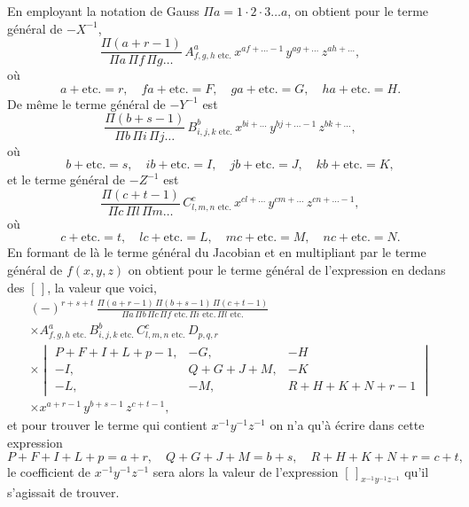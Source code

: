 \documentclass[11pt,a4paper]{book}
\begin{document}
En employant la notation de Gauss $\Pi a=1\cdot 2\cdot 3\ldots a$, on obtient pour le terme g\'{e}n\'{e}ral de $-X^{-1}$,
\[
\frac{\Pi(a+r-1)}{\Pi a\,\Pi f\,\Pi g\ldots}\,A^a_{f,g,h\text{ etc.}}\,x^{af+\ldots-1}\,y^{ag+\ldots}\,z^{ah+\ldots},
\]
o\`{u}
\[
a+\text{etc.}=r,\quad fa+\text{etc.}=F,\quad ga+\text{etc.}=G,\quad ha+\text{etc.}=H.
\]
De m\^{e}me le terme g\'{e}n\'{e}ral de $-Y^{-1}$ est
\[
\frac{\Pi(b+s-1)}{\Pi b\,\Pi i\,\Pi j\ldots}\,B^b_{i,j,k\text{ etc.}}\,x^{bi+\ldots}\,y^{bj+\ldots-1}\,z^{bk+\ldots},
\]
o\`{u}
\[
b+\text{etc.}=s,\quad ib+\text{etc.}=I,\quad jb+\text{etc.}=J,\quad kb+\text{etc.}=K,
\]
et le terme g\'{e}n\'{e}ral de $-Z^{-1}$ est
\[
\frac{\Pi(c+t-1)}{\Pi c\,\Pi l\,\Pi m\ldots}\,C^c_{l,m,n\text{ etc.}}\,x^{cl+\ldots}\,y^{cm+\ldots}\,z^{cn+\ldots-1},
\]
o\`{u}
\[
c+\text{etc.}=t,\quad lc+\text{etc.}=L,\quad mc+\text{etc.}=M,\quad nc+\text{etc.}=N.
\]
En formant de là le terme g\'{e}n\'{e}ral du Jacobian et en multipliant par le terme g\'{e}n\'{e}ral de $f(x,y,z)$ on obtient pour le terme g\'{e}n\'{e}ral de l'expression en dedans des $[\,]$, la valeur que voici,
\begin{multline*}
(-)^{r+s+t}\,\frac{\Pi(a+r-1)\,\Pi(b+s-1)\,\Pi(c+t-1)}{\Pi a\,\Pi b\,\Pi c\,\Pi f\text{ etc.}\,\Pi i\text{ etc.}\,\Pi l\text{ etc.}}\\
\times A^a_{f,g,h\text{ etc.}}\,B^b_{i,j,k\text{ etc.}}\,C^c_{l,m,n\text{ etc.}}\,D_{p,q,r}\\
\times\begin{vmatrix}
P+F+I+L+p-1, & -G, & -H\\
-I, & Q+G+J+M, & -K\\
-L, & -M, & R+H+K+N+r-1
\end{vmatrix}\\
\times x^{a+r-1}\,y^{b+s-1}\,z^{c+t-1},
\end{multline*}
et pour trouver le terme qui contient $x^{-1}y^{-1}z^{-1}$ on n'a qu'\`{a} \'{e}crire dans cette expression
\[
P+F+I+L+p=a+r,\quad Q+G+J+M=b+s,\quad R+H+K+N+r=c+t,
\]
le coefficient de $x^{-1}y^{-1}z^{-1}$ sera alors la valeur de l'expression $[\,]_{x^{-1}y^{-1}z^{-1}}$ qu'il s'agissait de trouver.

\bigskip
\end{document}
